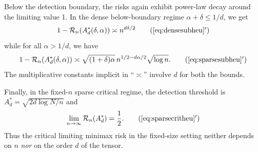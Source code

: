 \documentclass[11pt,reqno,letterpaper]{amsart}
\numberwithin{equation}{section}
\theoremstyle{plain}
\begin{document}
\vspace{0.15cm}

Below the detection boundary, the risks again exhibit power-law decay around the limiting 
value 1. In the dense below-boundary regime $\alpha + \delta \le 1/d$, we get
\begin{equation}\label{eq:densesubheud}
1-\mathcal R_n(A^\ast_d(\delta, \alpha))\asymp n^{d\delta/2}
\tag{\ref{eq:densesubheu}$'$}
\end{equation}
while for all $\alpha > 1/d$, we have
\begin{equation}\label{eq:sparsesubheud}
1-\mathcal R_n(A^\ast_d(\delta, \alpha))
    \asymp \sqrt{(1+\delta)\alpha}\, n^{1/2 - d\alpha/2}\sqrt{\log n}.
\tag{\ref{eq:sparsesubheu}$'$}    
\end{equation}
The multiplicative constants implicit in ``$\asymp$'' involve $d$ for both the 
bounds.

\vspace{0.1cm}

Finally, in the fixed-$n$ sparse critical regime, the detection threshold is 
$A^\ast_d = \sqrt{2d\log N/n}$ and 
\begin{equation}\label{eq:sparsecritheud}    
\lim_{n \to \infty} \mathcal R_n(A^\ast_d) = \frac12.
\tag{\ref{eq:sparsecritheu}$'$} 
\end{equation}
Thus the critical limiting minimax risk in the fixed-size setting neither depends on $n$ {\em nor} on the order $d$ of the tensor.
\end{document}
